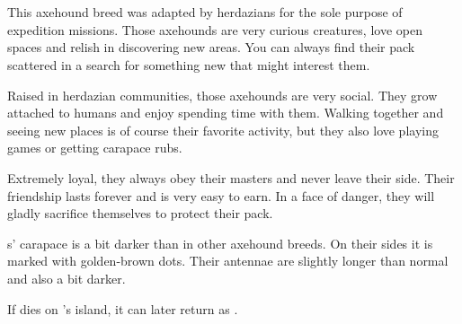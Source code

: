 \section{\enemyAxehoundName{}}
\label{enemyAxehound}

This axehound breed was adapted by herdazians for the sole purpose of expedition missions. Those axehounds are very curious creatures, love open spaces and relish in discovering new areas. You can always find their pack scattered in a search for something new that might interest them.

Raised in herdazian communities, those axehounds are very social. They grow attached to humans and enjoy spending time with them. Walking together and seeing new places is of course their favorite activity, but they also love playing games or getting carapace rubs.

Extremely loyal, they always obey their masters and never leave their side. Their friendship lasts forever and is very easy to earn. In a face of danger, they will gladly sacrifice themselves to protect their pack.

\enemyAxehound{}s' carapace is a bit darker than in other axehound breeds. On their sides it is marked with golden-brown dots. Their antennae are slightly longer than normal and also a bit darker.

If \enemyAxehound{} dies on \npcSprenVines{}'s island, it can later return as \enemyReanimatedAxehound{}.
\\


